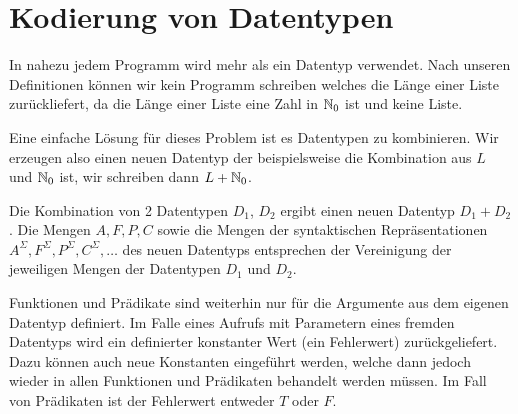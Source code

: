 \section{Kodierung von Datentypen}
In nahezu jedem Programm wird mehr als ein Datentyp verwendet.
Nach unseren Definitionen können wir kein Programm schreiben welches die Länge
einer Liste zurückliefert, da die Länge einer Liste eine Zahl in $\mathbb{N}_0$ ist und keine Liste.

Eine einfache Lösung für dieses Problem ist es Datentypen zu kombinieren.
Wir erzeugen also einen neuen Datentyp der beispielsweise die Kombination aus $L$ und $\mathbb{N}_0$ ist,
wir schreiben dann $L + \mathbb{N}_0$.

\begin{defn}
Die Kombination von 2 Datentypen $D_1$, $D_2$ ergibt einen neuen Datentyp $D_1+D_2$.
Die Mengen $A,F,P,C$ sowie die Mengen der syntaktischen Repräsentationen $A^{\Sigma}, F^{\Sigma}, P^{\Sigma}, C^{\Sigma}, \ldots$
des neuen Datentyps entsprechen der Vereinigung der jeweiligen Mengen der Datentypen $D_1$ und $D_2$.

Funktionen und Prädikate sind weiterhin nur für die Argumente aus dem eigenen Datentyp definiert.
Im Falle eines Aufrufs mit Parametern eines fremden Datentyps wird ein definierter konstanter Wert (ein Fehlerwert) zurückgeliefert.
Dazu können auch neue Konstanten eingeführt werden, welche dann jedoch wieder in allen Funktionen und Prädikaten behandelt werden müssen.
Im Fall von Prädikaten ist der Fehlerwert entweder $T$ oder $F$.
\end{defn}

